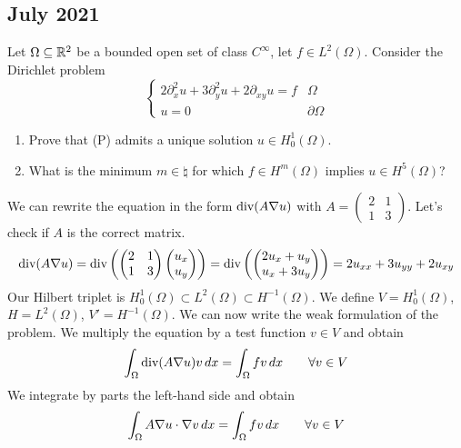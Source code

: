 \subsection{July 2021}
\begin{exercise}
    Let \(\Omega \subseteq \mathbb{R}^2\) be a bounded open set of class \(C^\infty\), let \(f \in L^2(\Omega)\). Consider the Dirichlet problem
    \[
        \begin{cases}
            2\partial^2_{x} u + 3\partial^2_{y} u + 2\partial_{xy} u = f & \Omega \\
            u = 0 & \partial\Omega
        \end{cases}
        \tag*{(P)}
    \]
    \begin{enumerate}
        \item Prove that (P) admits a unique solution \(u \in H^1_0(\Omega)\).
        \item What is the minimum \(m \in \natural\) for which \(f \in H^m(\Omega)\) implies \(u \in H^5(\Omega)\)?
    \end{enumerate}
\end{exercise}
We can rewrite the equation in the form \(\text{div}( A \nabla u)\) with \(A = \begin{pmatrix} 2 & 1 \\ 1 & 3 \end{pmatrix}\). Let's check if \(A\) is the correct matrix.
\[
    \begin{split}
        \text{div}(A \nabla u) = \text{div}\left(\begin{pmatrix} 2 & 1 \\ 1 & 3 \end{pmatrix} \begin{pmatrix} u_x \\ u_y \end{pmatrix}\right) = \text{div}\left(\begin{pmatrix} 2u_x + u_y \\ u_x + 3u_y \end{pmatrix}\right) = 2u_{xx} + 3u_{yy} + 2u_{xy}
    \end{split}
\]
Our Hilbert triplet is \(H^1_0(\Omega) \subset L^2(\Omega) \subset H^{-1}(\Omega)\). We define \(V = H^1_0(\Omega)\), \(H = L^2(\Omega)\), \(V' = H^{-1}(\Omega)\). We can now write the weak formulation of the problem. We multiply the equation by a test function \(v \in V\) and obtain
\[
    \int_\Omega \text{div}(A \nabla u) v \, dx = \int_\Omega f v \, dx \qquad \forall v \in V
\]
We integrate by parts the left-hand side and obtain
\[
    \int_\Omega A \nabla u \cdot \nabla v \, dx = \int_\Omega f v \, dx \qquad \forall v \in V
\]
